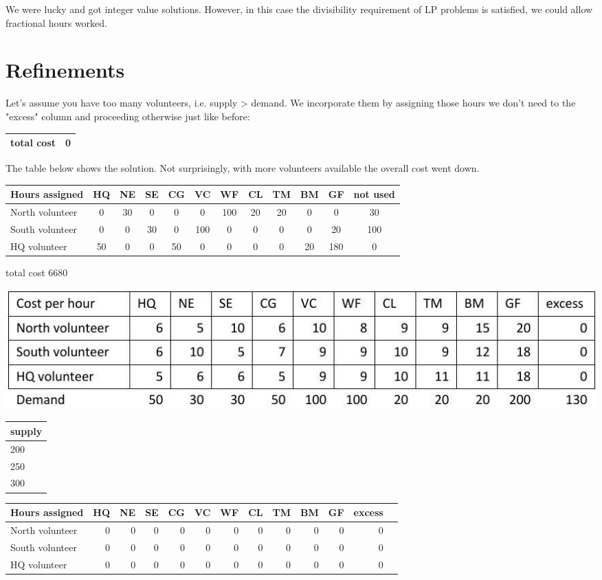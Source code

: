 \documentclass[10pt]{article}
\begin{document}
We were lucky and got integer value solutions. However, in this case the divisibility requirement of LP problems is satisfied, we could allow fractional hours worked.

\section{Refinements}
Let's assume you have too many volunteers, i.e. supply > demand. We incorporate them by assigning those hours we don't need to the "excess" column and proceeding otherwise just like before:

\begin{tabular}{|l|l|}
\hline
total cost & 0 \\
\hline
\end{tabular}

The table below shows the solution. Not surprisingly, with more volunteers available the overall cost went down.

\begin{tabular}{|l|c|c|c|c|c|c|c|c|c|c|c|}
\hline
Hours assigned & HQ & NE & SE & CG & VC & WF & CL & TM & BM & GF & not used \\
\hline
North volunteer & 0 & 30 & 0 & 0 & 0 & 100 & 20 & 20 & 0 & 0 & 30 \\
\hline
South volunteer & 0 & 0 & 30 & 0 & 100 & 0 & 0 & 0 & 0 & 20 & 100 \\
\hline
HQ volunteer & 50 & 0 & 0 & 50 & 0 & 0 & 0 & 0 & 20 & 180 & 0 \\
\hline
\end{tabular}

total cost 6680

\includegraphics[max width=\textwidth]{2022_07_05_5945264bba2a5f6ba667g-43}

\begin{tabular}{|l|}
\hline
supply \\
\hline
200 \\
\hline
250 \\
\hline
300 \\
\hline
\end{tabular}

\begin{tabular}{|l|r|r|r|r|r|r|r|r|r|r|r|r|}
\hline
Hours assigned & \multicolumn{1}{|l|}{HQ} & \multicolumn{1}{l|}{NE} & \multicolumn{1}{l|}{SE} & \multicolumn{1}{l|}{CG} & VC & WF & CL & TM & BM & GF & excess \\
\hline
North volunteer & 0 & 0 & 0 & 0 & 0 & 0 & 0 & 0 & 0 & 0 & 0 \\
\hline
South volunteer & 0 & 0 & 0 & 0 & 0 & 0 & 0 & 0 & 0 & 0 & 0 \\
\hline
HQ volunteer & 0 & 0 & 0 & 0 & 0 & 0 & 0 & 0 & 0 & 0 & 0 \\
\hline
\end{tabular}
\end{document}
